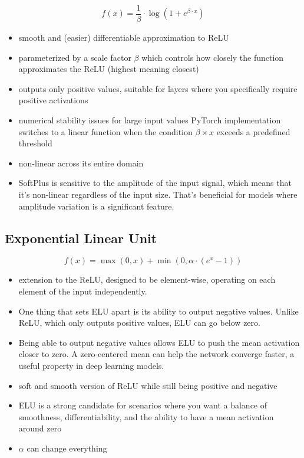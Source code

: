 \documentclass[11pt]{article}
\begin{document}
\begin{definition}\label{eq:activation-softplus}
    \begin{equation*}
        f(x) = \frac 1 \beta \cdot \log (1 + e ^{\beta \cdot x}) 
    \end{equation*}
\end{definition}

\begin{itemize}
    \item smooth and (easier) differentiable approximation to ReLU
    \item parameterized by a scale factor $\beta$ which controls how closely the function approximates the ReLU (highest meaning closest)
    \item outputs only positive values, suitable for layers where you specifically require positive activations
    \item numerical stability issues for large input values PyTorch implementation switches to a linear function when the condition $\beta \times x$ exceeds a predefined threshold
    \item non-linear across its entire domain
    \item SoftPlus is sensitive to the amplitude of the input signal, which means that it's non-linear regardless of the input size. That's beneficial for models where amplitude variation is a significant  feature.
\end{itemize}

\subsection{Exponential Linear Unit}

\begin{definition}\label{eq:activation-elu}
    \begin{equation*}
        f(x) = \max(0,x) + \min(0,\alpha \cdot (e^x - 1))
    \end{equation*}
\end{definition}

\begin{itemize}
    \item extension to the ReLU, designed to be element-wise, operating on each element of the input independently.
    \item One thing that sets ELU apart is its ability to output negative values. Unlike ReLU, which only outputs positive values, ELU can go below zero.
    \item Being able to output negative values allows ELU to push the mean activation closer to zero. A zero-centered mean can help the network converge faster, a useful property in deep learning models.
    \item soft and smooth version of ReLU while still being positive and negative 
    \item ELU is a strong candidate for scenarios where you want a balance of smoothness, differentiability, and the ability to have a mean activation around zero
    \item $\alpha$ can change everything
\end{itemize}
\end{document}
